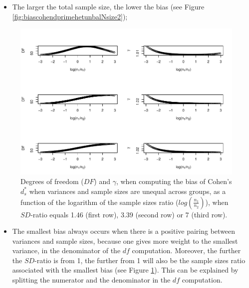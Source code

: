 \documentclass[
  english,
  man]{apa6}
\providecommand{\tightlist}{%
  \setlength{\itemsep}{0pt}\setlength{\parskip}{0pt}}
\begin{document}
\begin{itemize}
\tightlist
\item
  The larger the total sample size, the lower the bias (see Figure \ref{fig:biascohendprimehetunbalNsize2});
\end{itemize}

\begin{figure}
\centering
\includegraphics{Theoretical-Bias-of-all-estimators-as-a-function-of-population-parameters_files/figure-latex/biascohendprimehetunbalnratiosdratio2-1.pdf}
\caption{\label{fig:biascohendprimehetunbalnratiosdratio2}Degrees of freedom (\(DF\)) and \(\gamma\), when computing the bias of Cohen's \(d^*_s\) when variances and sample sizes are unequal across groups, as a function of the logarithm of the sample sizes ratio (\(log \left( \frac{n_1}{n_2} \right)\)), when \(SD\)-ratio equals 1.46 (first row), 3.39 (second row) or 7 (third row).}
\end{figure}

\begin{itemize}
\tightlist
\item
  The smallest bias always occurs when there is a positive pairing between variances and sample sizes, because one gives more weight to the smallest variance, in the denominator of the \(df\) computation. Moreover, the further the \(SD\)-ratio is from 1, the further from 1 will also be the sample sizes ratio associated with the smallest bias (see Figure \ref{fig:biascohendprimehetunbalnratiosdratio2}). This can be explained by splitting the numerator and the denominator in the \(df\) computation.
\end{itemize}
\end{document}
